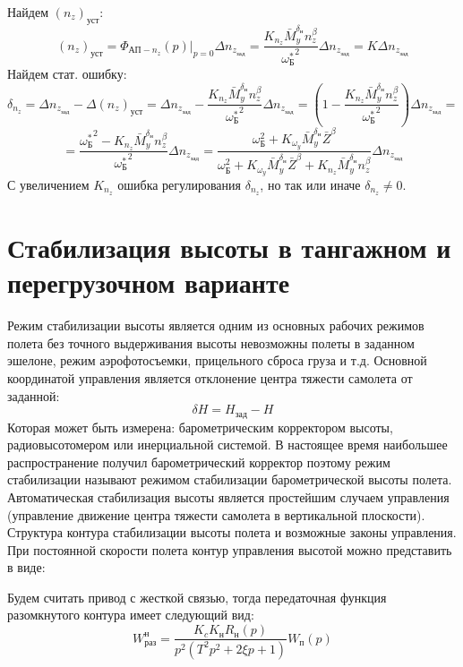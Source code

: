 \documentclass{article}
\begin{document}
Найдем $(n_z)_\text{уст}$:
\[
	(n_z)_\text{уст} = \Phi_{\text{АП}-n_z}(p) |_{p=0} \Delta n_{z_\text{зад}}
	=\frac{K_{n_z} \bar{M}_y^{\delta_\text{н}}
	n_z^\beta}{{\omega_\text{Б}^*}^2} \Delta n_{z_\text{зад}} = K \Delta
	n_{z_\text{зад}}
\]
Найдем стат. ошибку:
\[
	\delta_{n_z} = \Delta n_{z_\text{зад}} - \Delta (n_z)_\text{уст} = \Delta
	n_{z_\text{зад}} - \frac{K_{n_z}
	\bar{M}_y^{\delta_\text{н}}n_z^\beta}{{\omega_\text{Б}^*}^2} \Delta
	n_{z_\text{зад}} = \left( 1 - \frac{ K_{n_z} \bar{M}_y^{\delta_\text{н}}
		n_z^\beta}{{\omega_\text{Б}^*}^2} \right) \Delta n_{z_\text{зад}} =
\]
\[
	= \frac{{\omega_\text{Б}^*}^2 - K_{n_z} \bar{M}_y^{\delta_\text{н}}
	n_z^\beta}{ {\omega_\text{Б}^*}^2} \Delta n_{z_\text{зад}} =
	\frac{\omega_\text{Б}^2 + K_{\omega_y} \bar{M}_y^{\delta_\text{н}}
	\bar{Z}^\beta}{\omega_\text{Б}^2 + K_{\omega_y} \bar{M}_y^{\delta_\text{н}}
	\bar{Z}^\beta + K_{n_z} \bar{M}_y^{\delta_\text{н}} n_z^\beta} \Delta
	n_{z_\text{зад}}
\]
С увеличением $K_{n_z}$ ошибка регулирования $\delta_{n_z}$, но так или иначе
$\delta_{n_z} \neq 0$.

\section{Стабилизация высоты в тангажном и перегрузочном варианте}
Режим стабилизации высоты является одним из основных рабочих режимов полета без
точного выдерживания высоты невозможны полеты в заданном эшелоне, режим
аэрофотосъемки, прицельного сброса груза и т.д. Основной координатой управления
является отклонение центра тяжести самолета от заданной:
\[
	\delta H = H_\text{зад} - H
\]
Которая может быть измерена: барометрическим корректором высоты,
радиовысотомером или инерциальной системой. В настоящее время наибольшее
распространение получил барометрический корректор поэтому режим стабилизации
называют режимом стабилизации барометрической высоты полета. Автоматическая
стабилизация высоты является простейшим случаем управления (управление движение
центра тяжести самолета в вертикальной плоскости). Структура контура
стабилизации высоты полета и возможные законы управления. При постоянной
скорости полета контур управления высотой можно представить в виде:

\begin{figure}[H]
	\centering
	\label{fig:fig_50}
\end{figure}

Будем считать привод с жесткой связью, тогда передаточная функция разомкнутого
контура имеет следующий вид:
\[
	W_\text{раз}^\text{н} =\frac{K_c K_\text{н} R_\text{н}(p)}{p^2(T^2 p^2 + 2
		\xi p + 1)}W_\text{п}(p)
\]
\end{document}
